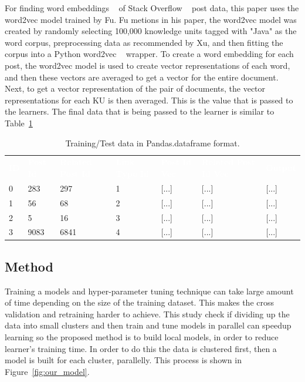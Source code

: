 \documentclass[sigconf]{acmart}
\theoremstyle{break}
\begin{document}
    For finding word embeddings ~\cite{mikolov2013distributed} of Stack Overflow ~\cite{barua2014developers} post data, this paper uses the word2vec model trained by Fu. Fu metions in his paper, the word2vec model was created by randomly selecting 100,000 knowledge units tagged with "Java" as the word corpus, preprocessing data as recommended by Xu, and then fitting the corpus into a Python word2vec ~\cite{rehurek2010software} wrapper. To create a word embedding for each post, the word2vec model is used to create vector representations of each word, and then these vectors are averaged to get a vector for the entire document. Next, to get a vector representation of the pair of documents, the vector representations for each KU is then averaged. This is the value that is passed to the learners. The final data that is being passed to the learner is similar to Table~\ref{tab:data_format}
    
    \begin{table}[h!]
        \centering
        \begin{tabular}{p{.3cm}|p{1cm}|p{1cm}|p{1cm}|p{1cm}|p{1cm}|p{1cm}}
        \rowcolor{darkgray} \textcolor{white}{\textbf{ID}} & \textcolor{white}{\textbf{Post Id}} & \textcolor{white}{\textbf{Related Post Id}} & \textcolor{white}{\textbf{Link Type Id}} & \textcolor{white}{\textbf{Post Id Vec}} & \textcolor{white}{\textbf{Related Post Id Vec}} & \textcolor{white}{\textbf{Output}}  \\
        0 & 283 & 297 & 1  & [...] & [...] & [...] \\
        \rowcolor{lightgray} 1 & 56 & 68 & 2  & [...] & [...] & [...] \\
        2 & 5 & 16 & 3  & [...] & [...] & [...] \\
        \rowcolor{lightgray} 3 & 9083 & 6841 & 4  & [...] & [...] & [...] \\
        \end{tabular}
        \caption{Training/Test data in Pandas.dataframe format.}
        \label{tab:data_format}
    \end{table}
    
    \subsection{Method}
    \label{sssec:Method}
    Training a models and hyper-parameter tuning technique can take large amount of time depending on the size of the training dataset. This makes the cross validation and retraining harder to achieve. This study check if dividing up the data into small clusters and then train and tune models in parallel can speedup learning so the proposed method is to build local models, in order to reduce learner's training time. In order to do this the data is clustered first, then a model is built for each cluster, parallelly. This process is shown in Figure~\ref{fig:our_model}.
    
\end{document}
